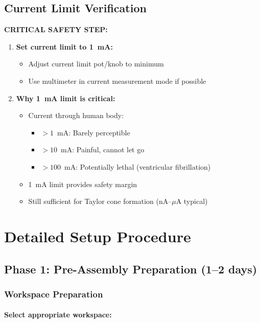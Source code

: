 \documentclass[11pt]{article}
\begin{document}
\subsection{Current Limit Verification}

\textbf{CRITICAL SAFETY STEP:}

\begin{enumerate}
\item \textbf{Set current limit to 1~mA:}
  \begin{itemize}
  \item Adjust current limit pot/knob to minimum
  \item Use multimeter in current measurement mode if possible
  \end{itemize}

\item \textbf{Why 1~mA limit is critical:}
  \begin{itemize}
  \item Current through human body:
    \begin{itemize}
    \item $>1$~mA: Barely perceptible
    \item $>10$~mA: Painful, cannot let go
    \item $>100$~mA: Potentially lethal (ventricular fibrillation)
    \end{itemize}
  \item 1~mA limit provides safety margin
  \item Still sufficient for Taylor cone formation (nA--$\mu$A typical)
  \end{itemize}
\end{enumerate}

\section{Detailed Setup Procedure}

\subsection{Phase 1: Pre-Assembly Preparation (1--2 days)}

\subsubsection{Workspace Preparation}

\paragraph{Select appropriate workspace:}
\end{document}
